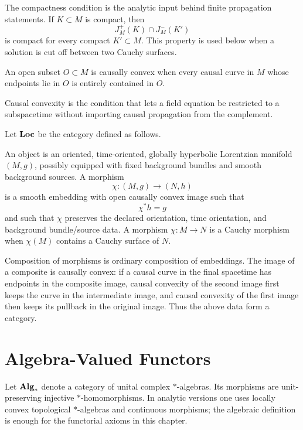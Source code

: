 The compactness condition is the analytic input behind finite propagation
statements.  If \(K\subset M\) is compact, then
\[
  J_M^+(K)\cap J_M^-(K')
\]
is compact for every compact \(K'\subset M\).  This property is used below
when a solution is cut off between two Cauchy surfaces.

\begin{definition}
\label{def:causally-convex-subset}
An open subset \(O\subset M\) is causally convex when every causal curve in
\(M\) whose endpoints lie in \(O\) is entirely contained in \(O\).
\end{definition}

Causal convexity is the condition that lets a field equation be restricted
to a subspacetime without importing causal propagation from the complement.

\begin{definition}
\label{def:background-category-loc}
Let \({\bf Loc}\) be the category defined as follows.

An object is an oriented, time-oriented, globally hyperbolic Lorentzian
manifold \((M,g)\), possibly equipped with fixed background bundles and
smooth background sources.  A morphism
\[
  \chi:(M,g)\longrightarrow (N,h)
\]
is a smooth embedding with open causally convex image such that
\[
  \chi^*h=g
\]
and such that \(\chi\) preserves the declared orientation, time orientation,
and background bundle/source data.  A morphism \(\chi:M\to N\) is a Cauchy
morphism when \(\chi(M)\) contains a Cauchy surface of \(N\).
\end{definition}

Composition of morphisms is ordinary composition of embeddings.  The image
of a composite is causally convex: if a causal curve in the final spacetime
has endpoints in the composite image, causal convexity of the second image
first keeps the curve in the intermediate image, and causal convexity of the
first image then keeps its pullback in the original image.  Thus the above
data form a category.

\section{Algebra-Valued Functors}

Let \({\bf Alg}_*\) denote a category of unital complex \(\ast\)-algebras.
Its morphisms are unit-preserving injective \(\ast\)-homomorphisms.  In
analytic versions one uses locally convex topological \(\ast\)-algebras and
continuous morphisms; the algebraic definition is enough for the functorial
axioms in this chapter.

